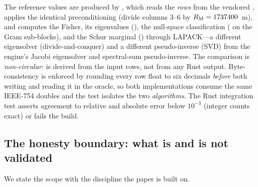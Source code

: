 The reference values are produced by , which reads
the \emph{rows} from the vendored , applies the identical
preconditioning (divide columns $3$--$6$ by $R_{\mathrm{M}}=1737400$~m), and computes the Fisher,
its eigenvalues (), the null-space classification
( on the Gram sub-blocks), and the Schur marginal
() through LAPACK---a different eigensolver (divide-and-conquer) and a
different pseudo-inverse (SVD) from the engine's Jacobi eigensolver and spectral-sum
pseudo-inverse. The comparison is \emph{non-circular}:  is derived from
the input rows, not from any Rust output. Byte-consistency is enforced by rounding every row
float to six decimals \emph{before} both writing  and reading it in the
oracle, so both implementations consume the same IEEE-754 doubles and the test isolates the
two \emph{algorithms}. The Rust integration test
 asserts agreement to relative and absolute
error below $10^{-3}$ (integer counts exact) or fails the build.

\subsection{The honesty boundary: what is and is not validated}
\label{sec:boundary}

We state the scope with the discipline the paper is built on.

